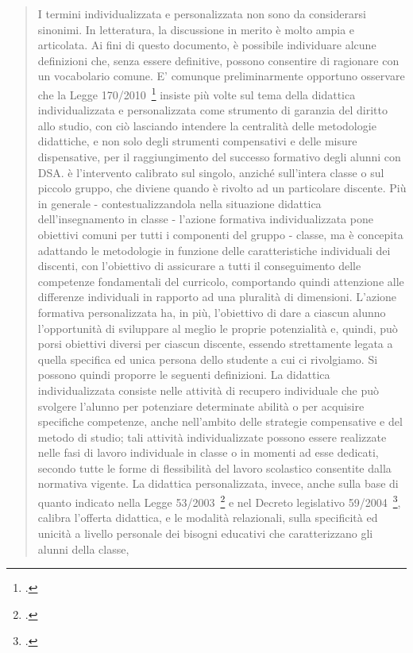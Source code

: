 \begin{quote}
\begin{description}
		\mancatesto I termini individualizzata e personalizzata non sono da considerarsi sinonimi. In letteratura, la discussione in merito è molto ampia e articolata. Ai fini di questo documento, è possibile individuare alcune definizioni che, senza essere definitive, possono consentire di ragionare con un vocabolario comune.
		E’ comunque preliminarmente opportuno osservare che la Legge 170/2010~\footcite{legge170} insiste più volte
		sul tema della didattica individualizzata e personalizzata come strumento di garanzia del diritto allo
		studio, con ciò lasciando intendere la centralità delle metodologie didattiche, e non solo degli
		strumenti compensativi e delle misure dispensative, per il raggiungimento del successo formativo
		degli alunni con DSA.
		 è l'intervento calibrato sul singolo, anziché sull'intera classe o sul piccolo
		gruppo, che diviene  quando è rivolto ad un particolare discente.
		Più in generale - contestualizzandola nella situazione didattica dell'insegnamento in classe -
		l'azione formativa individualizzata pone obiettivi comuni per tutti i componenti del gruppo - classe,
		ma è concepita adattando le metodologie in funzione delle caratteristiche individuali dei discenti,
		con l'obiettivo di assicurare a tutti il conseguimento delle competenze fondamentali del curricolo,
		comportando quindi attenzione alle differenze individuali in rapporto ad una pluralità di dimensioni.
		L'azione formativa personalizzata ha, in più, l'obiettivo di dare a ciascun alunno l'opportunità
		di sviluppare al meglio le proprie potenzialità e, quindi, può porsi obiettivi diversi per ciascun
		discente, essendo strettamente legata a quella specifica ed unica persona dello studente a cui ci
		rivolgiamo. Si possono quindi proporre le seguenti definizioni.
		La didattica individualizzata consiste nelle attività di recupero individuale che può svolgere
		l'alunno per potenziare determinate abilità o per acquisire specifiche competenze, anche nell'ambito
		delle strategie compensative e del metodo di studio; tali attività individualizzate possono essere
		realizzate nelle fasi di lavoro individuale in classe o in momenti ad esse dedicati, secondo tutte le
		forme di flessibilità del lavoro scolastico consentite dalla normativa vigente.
		La didattica personalizzata, invece, anche sulla base di quanto indicato nella Legge 53/2003~\footcite{Legge_53_2003} e
		nel Decreto legislativo 59/2004~\footcite{DL_59_2004}, calibra l'offerta didattica, e le modalità relazionali, sulla specificità
		ed unicità a livello personale dei bisogni educativi che caratterizzano gli alunni della classe,

\end{description}
\end{quote}
